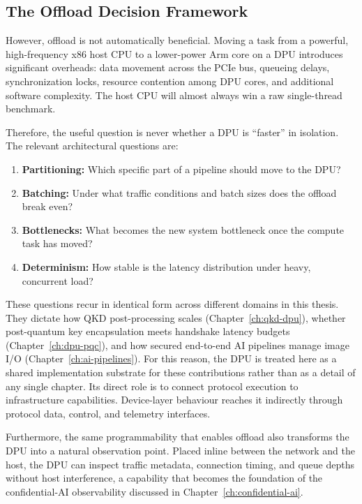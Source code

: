 \subsection{The Offload Decision Framework}

However, offload is not automatically beneficial. Moving a task from a powerful,
high-frequency x86 host CPU to a lower-power Arm core on a DPU introduces significant
overheads: data movement across the PCIe bus, queueing delays, synchronization locks,
resource contention among DPU cores, and additional software complexity. The host CPU
will almost always win a raw single-thread benchmark.

Therefore, the useful question is never whether a DPU is ``faster'' in isolation. The
relevant architectural questions are:
\begin{enumerate}
    \item \textbf{Partitioning:} Which specific part of a pipeline should move to the DPU?
    \item \textbf{Batching:} Under what traffic conditions and batch sizes does the offload break even?
    \item \textbf{Bottlenecks:} What becomes the new system bottleneck once the compute task has moved?
    \item \textbf{Determinism:} How stable is the latency distribution under heavy, concurrent load?
\end{enumerate}

These questions recur in identical form across different domains in this thesis. They
dictate how QKD post-processing scales (Chapter~\ref{ch:qkd-dpu}), whether post-quantum
key encapsulation meets handshake latency budgets (Chapter~\ref{ch:dpu-pqc}), and how
secured end-to-end AI pipelines manage image I/O (Chapter~\ref{ch:ai-pipelines}).
For this reason, the DPU is treated here as a shared implementation substrate
for these contributions rather than as a detail of any single chapter. Its
direct role is to connect protocol execution to infrastructure capabilities.
Device-layer behaviour reaches it indirectly through protocol data, control,
and telemetry interfaces.

Furthermore, the same programmability that enables offload also transforms the DPU into
a natural observation point. Placed inline between the network and the host, the DPU
can inspect traffic metadata, connection timing, and queue depths without host interference,
a capability that becomes the foundation of the confidential-AI observability discussed
in Chapter~\ref{ch:confidential-ai}.
